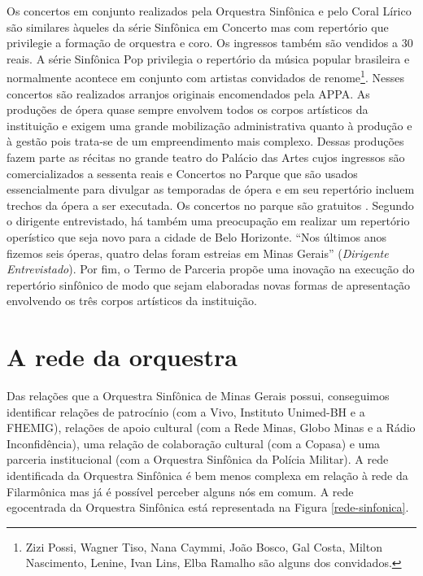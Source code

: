 \documentclass[a4paper, 12pt, openright, oneside, german, french, english, brazil]{abntex2}
\begin{document}
	Os concertos em conjunto realizados pela Orquestra Sinfônica e pelo Coral Lírico são similares àqueles da série Sinfônica em Concerto mas com repertório que privilegie a formação de orquestra e coro. Os ingressos também são vendidos a 30 reais. A série Sinfônica Pop privilegia o repertório da música popular brasileira e normalmente acontece em conjunto com artistas convidados de renome\footnote{Zizi Possi, Wagner Tiso, Nana Caymmi, João Bosco, Gal Costa, Milton Nascimento, Lenine, Ivan Lins, Elba Ramalho são alguns dos convidados.}. Nesses concertos são realizados arranjos originais encomendados pela APPA. As produções de ópera quase sempre envolvem todos os corpos artísticos da instituição e exigem uma grande mobilização administrativa quanto à produção e à gestão pois trata-se de um empreendimento mais complexo. Dessas produções fazem parte as récitas no grande teatro do Palácio das Artes cujos ingressos são comercializados a sessenta reais e Concertos no Parque que são usados essencialmente para divulgar as temporadas de ópera e em seu repertório incluem trechos da ópera a ser executada. Os concertos no parque são gratuitos \cite{appa2017parceria}. Segundo o dirigente entrevistado, há também uma preocupação em realizar um repertório operístico que seja novo para a cidade de Belo Horizonte. ``Nos últimos anos fizemos seis óperas, quatro delas foram estreias em Minas Gerais'' (\textit{Dirigente Entrevistado}). Por fim, o Termo de Parceria propõe uma inovação na execução do repertório sinfônico de modo que sejam elaboradas novas formas de apresentação envolvendo os três corpos artísticos da instituição. 
	
	\section{A rede da orquestra}
	
	Das relações que a Orquestra Sinfônica de Minas Gerais possui, conseguimos identificar relações de patrocínio (com a Vivo, Instituto Unimed-BH e a FHEMIG), relações de apoio cultural (com a Rede Minas, Globo Minas e a Rádio Inconfidência), uma relação de colaboração cultural (com a Copasa) e uma parceria institucional (com a Orquestra Sinfônica da Polícia Militar). A rede identificada da Orquestra Sinfônica é bem menos complexa em relação à rede da Filarmônica mas já é possível perceber alguns nós em comum. A rede egocentrada da Orquestra Sinfônica está representada na Figura \ref{rede-sinfonica}.
	
\end{document}
